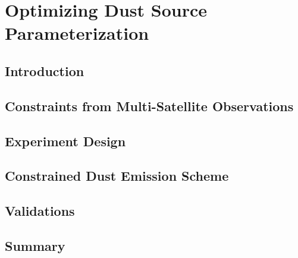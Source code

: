 \chapter{Optimizing Dust Source Parameterization} \label{chap:optdead}

\section{Introduction}

\section{Constraints from Multi-Satellite Observations}

\section{Experiment Design}

\section{Constrained Dust Emission Scheme}

\section{Validations}

\section{Summary}
